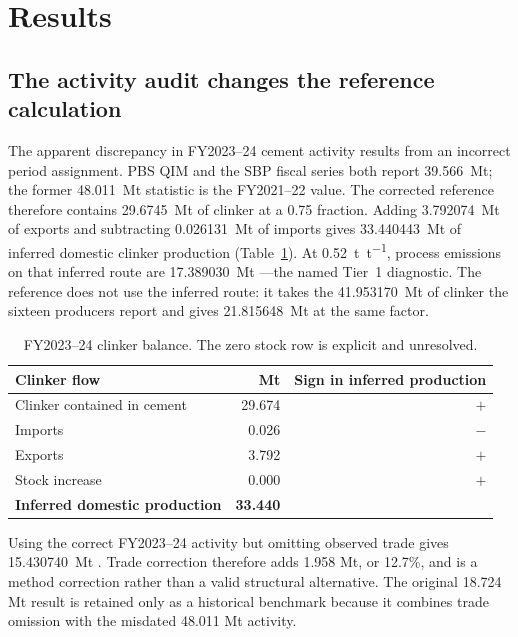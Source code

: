 \section{Results}
\label{sec:results}

\subsection{The activity audit changes the reference calculation}

The apparent discrepancy in FY2023--24 cement activity results from an incorrect period
assignment. PBS QIM and the SBP
fiscal series both report \SI{39.566}{\mega\tonne}; the former
\SI{48.011}{\mega\tonne} statistic is the FY2021--22 value. The corrected reference therefore
contains \SI{29.6745}{\mega\tonne} of clinker at a 0.75 fraction. Adding
\SI{3.792074}{\mega\tonne} of exports and subtracting
\SI{0.026131}{\mega\tonne} of imports gives \SI{33.440443}{\mega\tonne} of inferred domestic
clinker production (Table~\ref{tab:balance}). At \SI{0.52}{\tonne\per\tonne}, process
emissions on that inferred route are \SI{17.389030}{\mega\tonne} \COtwo{}---the named
Tier~1 diagnostic. The reference does not use the inferred route: it takes the
\SI{41.953170}{\mega\tonne} of clinker the sixteen producers report and gives
\SI{21.815648}{\mega\tonne} \COtwo{} at the same factor.

\begin{table}[htbp]
\centering
\footnotesize
\begin{tabular}{@{}lrr@{}}
\toprule
\textbf{Clinker flow} & \textbf{Mt} & \textbf{Sign in inferred production} \\
\midrule
Clinker contained in cement & 29.674 & $+$ \\
Imports                     &  0.026 & $-$ \\
Exports                     &  3.792 & $+$ \\
Stock increase              &  0.000 & $+$ \\
\midrule
\textbf{Inferred domestic production} & \textbf{33.440} & \\
\bottomrule
\end{tabular}
\caption{FY2023--24 clinker balance. The zero stock row is explicit and unresolved.}
\label{tab:balance}
\end{table}

Using the correct FY2023--24 activity but omitting observed trade gives
\SI{15.430740}{\mega\tonne} \COtwo{}. Trade correction therefore adds 1.958 Mt, or 12.7\%,
and is a method correction rather than a valid structural alternative. The original
18.724 Mt result is retained only as a historical benchmark because it combines trade omission with the
misdated 48.011 Mt activity.

